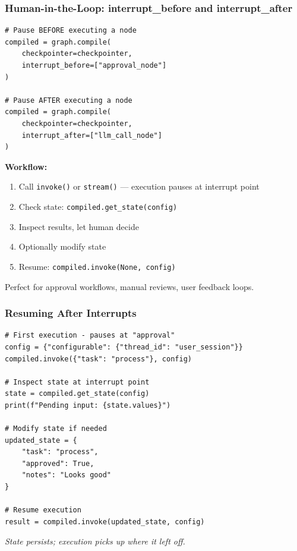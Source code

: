 \documentclass[aspectratio=169,11pt]{beamer}
\begin{document}
\begin{frame}[fragile]
\frametitle{Human-in-the-Loop: interrupt\_before and interrupt\_after}
\begin{lstlisting}
# Pause BEFORE executing a node
compiled = graph.compile(
    checkpointer=checkpointer,
    interrupt_before=["approval_node"]
)

# Pause AFTER executing a node
compiled = graph.compile(
    checkpointer=checkpointer,
    interrupt_after=["llm_call_node"]
)
\end{lstlisting}

\vspace{10pt}
\textbf{Workflow:}
\begin{enumerate}
    \setlength{\itemsep}{1pt}
  \item Call \texttt{invoke()} or \texttt{stream()} — execution pauses at interrupt point
  \item Check state: \texttt{compiled.get\_state(config)}
  \item Inspect results, let human decide
  \item Optionally modify state
  \item Resume: \texttt{compiled.invoke(None, config)}
\end{enumerate}

\vspace{10pt}
Perfect for approval workflows, manual reviews, user feedback loops.
\end{frame}

\begin{frame}[fragile]
\frametitle{Resuming After Interrupts}
\begin{lstlisting}
# First execution - pauses at "approval"
config = {"configurable": {"thread_id": "user_session"}}
compiled.invoke({"task": "process"}, config)

# Inspect state at interrupt point
state = compiled.get_state(config)
print(f"Pending input: {state.values}")

# Modify state if needed
updated_state = {
    "task": "process",
    "approved": True,
    "notes": "Looks good"
}

# Resume execution
result = compiled.invoke(updated_state, config)
\end{lstlisting}

\vspace{10pt}
\textit{State persists; execution picks up where it left off.}
\end{frame}
\end{document}
